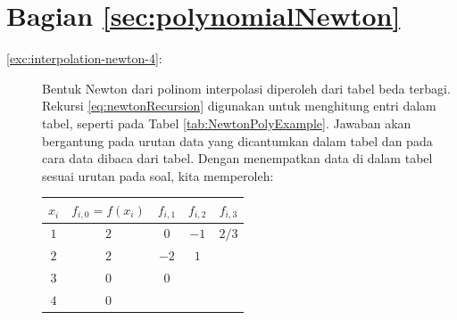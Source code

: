\section*{Bagian \ref{sec:polynomialNewton}}
\begin{description}
\item [{\ref{exc:interpolation-newton-4}:}] Bentuk Newton dari polinom
interpolasi diperoleh dari tabel beda terbagi. Rekursi \ref{eq:newtonRecursion}
digunakan untuk menghitung entri dalam tabel, seperti pada Tabel \ref{tab:NewtonPolyExample}.
Jawaban akan bergantung pada urutan data yang dicantumkan dalam tabel
dan pada cara data dibaca dari tabel. Dengan menempatkan data di dalam
tabel sesuai urutan pada soal, kita memperoleh:

\begin{center}
\begin{tabular}{ccccc}
$x_{i}$ & $f_{i,0}=f(x_{i})$ & $f_{i,1}$ & $f_{i,2}$ & $f_{i,3}$\tabularnewline
\hline 
$1$ & $2$ & $0$ & $-1$ & $2/3$\tabularnewline
$2$ & $2$ & $-2$ & $1$ & \tabularnewline
$3$ & $0$ & $0$ &  & \tabularnewline
$4$ & $0$ &  &  & \tabularnewline
\end{tabular}
\par\end{center}


\end{description}
